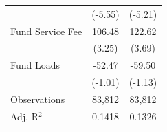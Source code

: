 {\begin{tabular}{l*{2}{c}}
                    &     (-5.55)         &     (-5.21)         \\
\addlinespace
Fund Service Fee    &      106.48\sym{***}&      122.62\sym{***}\\
                    &      (3.25)         &      (3.69)         \\
\addlinespace
Fund Loads          &      -52.47         &      -59.50         \\
                    &     (-1.01)         &     (-1.13)         \\
\midrule
Observations        &      83,812         &      83,812         \\
Adj. R$^{2}$        &      0.1418         &      0.1326         \\
\bottomrule
\end{tabular}
}
